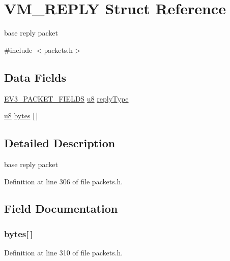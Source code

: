 \hypertarget{struct_v_m___r_e_p_l_y}{}\section{V\+M\+\_\+\+R\+E\+P\+L\+Y Struct Reference}
\label{struct_v_m___r_e_p_l_y}


base reply packet  




{\ttfamily \#include $<$packets.\+h$>$}

\subsection*{Data Fields}
\begin{DoxyCompactItemize}
\item 
\hyperlink{packets_8h_a948b7811b250da5bc1297c8d0c4c698b}{E\+V3\+\_\+\+P\+A\+C\+K\+E\+T\+\_\+\+F\+I\+E\+L\+D\+S} \hyperlink{defs_8h_a92c50087ca0e64fa93fc59402c55f8ca}{u8} \hyperlink{struct_v_m___r_e_p_l_y_a22d54946f3de285a0602996eeab97bb2}{reply\+Type}
\item 
\hyperlink{defs_8h_a92c50087ca0e64fa93fc59402c55f8ca}{u8} \hyperlink{struct_v_m___r_e_p_l_y_a1fdde1580342b6b1df0d8f5213c45107}{bytes} \mbox{[}$\,$\mbox{]}
\end{DoxyCompactItemize}


\subsection{Detailed Description}
base reply packet 

Definition at line 306 of file packets.\+h.



\subsection{Field Documentation}
\hypertarget{struct_v_m___r_e_p_l_y_a1fdde1580342b6b1df0d8f5213c45107}{}
\subsubsection[{bytes}]{ bytes\mbox{[}$\,$\mbox{]}}\label{struct_v_m___r_e_p_l_y_a1fdde1580342b6b1df0d8f5213c45107}


Definition at line 310 of file packets.\+h.

